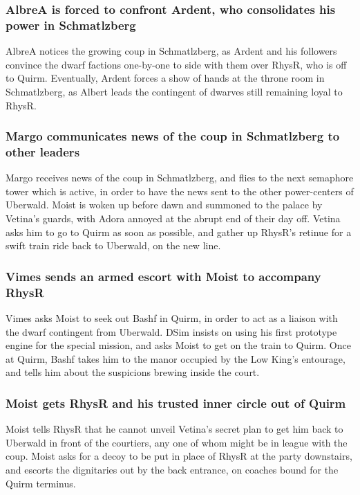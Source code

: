 \subsubsection{\Gls{AlbreA} is forced to confront \Gls{Ardent}, who consolidates his power in
    Schmatlzberg}
\Gls{AlbreA} notices the growing coup in Schmatlzberg, as \Gls{Ardent} and his followers convince
the dwarf factions one-by-one to side with them over \Gls{RhysR}, who is off to Quirm. Eventually,
\Gls{Ardent} forces a show of hands at the throne room in Schmatlzberg, as \Gls{Albert} leads the
contingent of dwarves still remaining loyal to \Gls{RhysR}.

\subsubsection{\Gls{Margo} communicates news of the coup in Schmatlzberg to other leaders}
\Gls{Margo} receives news of the coup in Schmatlzberg, and flies to the next semaphore tower which
is active, in order to have the news sent to the other power-centers of Uberwald. \Gls{Moist} is
woken up before dawn and summoned to the palace by \Gls{Vetina}'s guards, with \Gls{Adora} annoyed
at the abrupt end of their day off. \Gls{Vetina} asks him to go to Quirm as soon as possible, and
gather up \Gls{RhysR}'s retinue for a swift train ride back to Uberwald, on the new line.

\subsubsection{\Gls{Vimes} sends an armed escort with \Gls{Moist} to accompany \Gls{RhysR}}
\Gls{Vimes} asks \Gls{Moist} to seek out \Gls{Bashf} in Quirm, in order to act as a liaison with the
dwarf contingent from Uberwald. \Gls{DSim} insists on using his first prototype engine for the
special mission, and asks \Gls{Moist} to get on the train to Quirm. Once at Quirm, \Gls{Bashf} takes
him to the manor occupied by the Low King's entourage, and tells him about the suspicions brewing
inside the court.

\subsubsection{\Gls{Moist} gets \Gls{RhysR} and his trusted inner circle out of Quirm}
\Gls{Moist} tells \Gls{RhysR} that he cannot unveil \Gls{Vetina}'s secret plan to get him back to
Uberwald in front of the courtiers, any one of whom might be in league with the coup. \Gls{Moist}
asks for a decoy to be put in place of \Gls{RhysR} at the party downstairs, and escorts the
dignitaries out by the back entrance, on coaches bound for the Quirm terminus.

